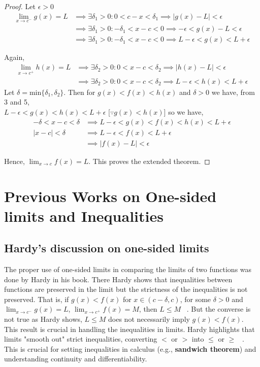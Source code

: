 \documentclass[a4paper,twoside,12pt]{article}
\theoremstyle{plain}
\theoremstyle{definition}
\theoremstyle{theorem}
\begin{document}
{ \begin{proof}

 Let \(\epsilon > 0\)
 \begin{align}
   \lim_{x \to c^-} g(x) = L & \implies \exists {\delta}_1 >0 : 0<c-x< \delta_1 \implies |g(x)-L|< \epsilon \\
                             &\implies \exists {\delta}_1 >0 : -\delta_1 <x-c< 0 \implies -\epsilon < g(x)-L< \epsilon \\
   &\implies \exists {\delta}_1 >0 : -\delta_1 <x-c< 0 \implies L -\epsilon < g(x)< L  + \epsilon
 \end{align}

 Again,
 \begin{align}
   \lim_{x \to c^+} h(x) =L & \implies \exists {\delta}_2 >0 : 0<x-c<\delta_2 \implies |h(x)-L|< \epsilon \\
   & \implies \exists {\delta}_2 >0 : 0<x-c<\delta_2 \implies L -\epsilon < h(x)< L  + \epsilon
 \end{align}
 Let \(\delta = \text{min}\{\delta_1, \delta_2\}\). Then for \(g(x) < f(x) < h(x)\) and \(\delta >0\) we have, from 3 and 5, \\
 \(L -\epsilon < g(x) < h(x)< L  + \epsilon \) [\(\because g(x) < h(x)\)] so we have,
 \begin{align}
-\delta < x-c < \delta & \implies   L -\epsilon < g(x) < f(x) < h(x)< L  + \epsilon \\
  |x-c| < \delta & \implies L -\epsilon < f(x)< L  + \epsilon \\
   & \implies |f(x) -L| < \epsilon
 \end{align}

 Hence, $\displaystyle \lim_{x \to c} f(x)=L$. This proves the extended theorem.
\end{proof}

\setcounter{thm}{2}

\section{Previous Works on One-sided limits and Inequalities}
\subsection{Hardy's discussion on one-sided limits}
The proper use of one-sided limits in comparing the limits of two functions was done by Hardy in his book. There Hardy shows that inequalities between functions are preserved in the limit but the strictness of the inequalities is not preserved. That is, if $g(x) < f(x)$ for $x \in (c-\delta ,c )$, for some $\delta >0$ and $\lim_{x \to c^-} g(x) = L$, $\lim_{x \to c^+} f(x) =M$, then $L \leq M$ ~\cite{hardy}. But the converse is not true as Hardy shows, $L \leq M$ does not necessarily imply $g(x) < f(x)$. \\[2mm]
This result is crucial in handling the inequalities in limits. Hardy highlights that limits "smooth out" strict inequalities, converting $<$ or $>$ into $\leq$ or $\geq$ ~\cite{hardy}. This is crucial for setting inequalities in calculus (e.g., \textbf{sandwich theorem}) and understanding continuity and differentiability.

}
\end{document}
